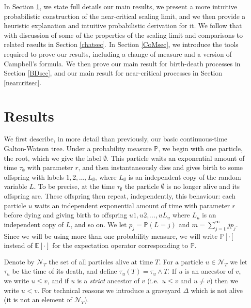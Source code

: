 \documentclass{article}
\theoremstyle{plain}
\theoremstyle{definition}
\renewcommand{\P}{\mathbb{P}}
\newcommand{\E}{\mathbb{E}}
\newcommand{\Nc}{\mathcal{N}}
\begin{document}
In Section \ref{sec:results}, we state full details our main results, we present a more intuitive probabilistic construction of the near-critical scaling limit, and we  then provide a heuristic explanation and intuitive probabilistic derivation for it. 
We follow that with discussion of some of the properties of the scaling limit and comparisons to related results in Section \ref{chatsec}. In Section \ref{CoMsec}, we introduce the tools required to prove our results, including a change of measure and a version of Campbell's formula. We then prove our main result for birth-death processes in Section \ref{BDsec}, and our main result for near-critical processes in Section \ref{nearcritsec}.

















\section{Results}\label{sec:results}

We first describe, in more detail than previously, our basic continuous-time Galton-Watson tree. Under a probability measure $\P$, we begin with one particle, the root, which we give the label $\emptyset$. This particle waits an exponential amount of time $\tau_\emptyset$ with parameter $r$, and then instantaneously dies and gives birth to some offspring with labels $1,2,\ldots,L_\emptyset$, where $L_\emptyset$ is an independent copy of the random variable $L$. To be precise, at the time $\tau_\emptyset$ the particle $\emptyset$ is no longer alive and its offspring are. These offspring then repeat, independently, this behaviour: each particle $u$ waits an independent exponential amount of time with parameter $r$ before dying and giving birth to offspring $u1, u2, \ldots, uL_u$ where $L_u$ is an independent copy of $L$, and so on. We let $p_j=\P(L = j)$ and $m=\sum_{j=1}^\infty j p_j$. Since we will be using more than one probability measure, we will write $\P[\cdot]$ instead of $\E[\cdot]$ for the expectation operator corresponding to $\P$.

Denote by $\Nc_T$ the set of all particles alive at time $T$. For a particle $u\in \Nc_T$ we let $\tau_u$ be the time of its death, and define $\tau_u(T) = \tau_u \wedge T$. If $u$ is an ancestor of $v$, we write $u\le v$, and if $u$ is a \emph{strict} ancestor of $v$ (i.e.~$u\le v$ and $u\neq v$) then we write $u<v$. For technical reasons we introduce a graveyard $\Delta$ which is not alive (it is not an element of $\Nc_T$).
\end{document}
